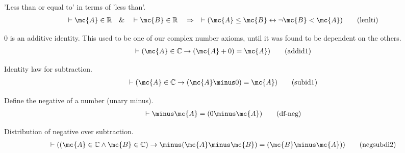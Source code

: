 \begin{lemma} 'Less than or equal to' in terms of 'less
than'.  
\begin{align}
\vdash \mc{A} \in \mathbb{R}\quad\&\quad \vdash \mc{B} \in
    \mathbb{R}\quad\Rightarrow\quad \vdash ( \mc{A} \le \mc{B} \leftrightarrow
    \lnot \mc{B} < \mc{A} )\label{eq:lenlti}\tag{lenlti}
\end{align}
\end{lemma}


\begin{lemma} $0$ is an additive identity.  This used to
be one of our complex
       number axioms, until it was found to be dependent on the others.  
\begin{align}
\vdash ( \mc{A} \in \mathbb{C} \rightarrow ( \mc{A} + 0 ) = \mc{A}
    )\label{eq:addid1}\tag{addid1}
\end{align}
\end{lemma}


\begin{lemma} Identity law for subtraction.  
\begin{align}
\vdash ( \mc{A} \in \mathbb{C} \rightarrow ( \mc{A} \minus 0 ) = \mc{A}
    )\label{eq:subid1}\tag{subid1}
\end{align}
\end{lemma}


\begin{metadefinition} Define the negative of a number (unary
minus).  
\begin{align}
\vdash \minus\mc{A} = ( 0 \minus \mc{A} )\label{eq:df-neg}\tag{df-neg}
\end{align}
\end{metadefinition}


\begin{lemma} Distribution of negative over
subtraction.  
\begin{align}
\vdash ( ( \mc{A} \in \mathbb{C} \wedge \mc{B} \in \mathbb{C} ) \rightarrow
    \minus ( \mc{A} \minus \mc{B} ) = ( \mc{B} \minus \mc{A} )
    )\label{eq:negsubdi2}\tag{negsubdi2}
\end{align}
\end{lemma}


